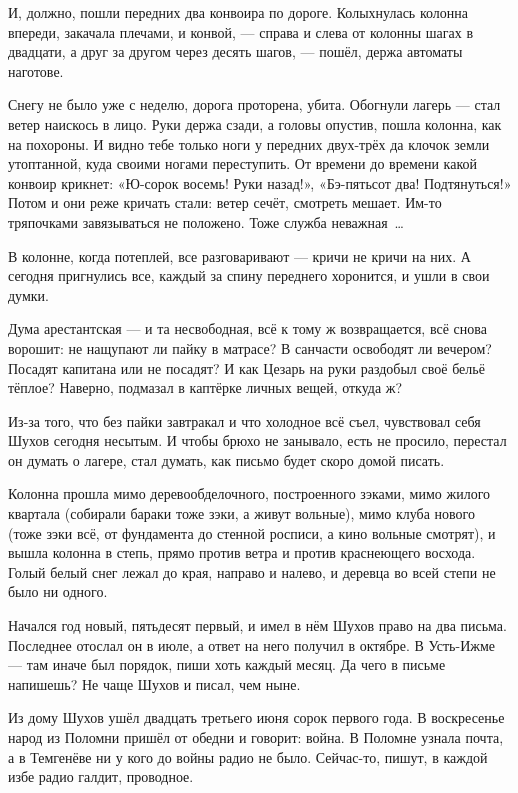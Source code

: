 И, должно, пошли передних два конвоира по дороге. Колыхнулась колонна впереди, закачала плечами, и конвой, --- справа и слева от колонны шагах в двадцати, а друг за другом через десять шагов, --- пошёл, держа автоматы наготове.

Снегу не было уже с неделю, дорога проторена, убита. Обогнули лагерь --- стал ветер наискось в лицо. Руки держа сзади, а головы опустив, пошла колонна, как на похороны. И видно тебе только ноги у передних двух-трёх да клочок земли утоптанной, куда своими ногами переступить. От времени до времени какой конвоир крикнет: «Ю-сорок восемь! Руки назад!», «Бэ-пятьсот два! Подтянуться!» Потом и они реже кричать стали: ветер сечёт, смотреть мешает. Им-то тряпочками завязываться не положено. Тоже служба неважная~\dots{}

В колонне, когда потеплей, все разговаривают --- кричи не кричи на них. А сегодня пригнулись все, каждый за спину переднего хоронится, и ушли в свои думки.

Дума арестантская --- и та несвободная, всё к тому ж возвращается, всё снова ворошит: не нащупают ли пайку в матрасе? В санчасти освободят ли вечером? Посадят капитана или не посадят? И как Цезарь на руки раздобыл своё бельё тёплое? Наверно, подмазал в каптёрке личных вещей, откуда ж?

Из-за того, что без пайки завтракал и что холодное всё съел, чувствовал себя Шухов сегодня несытым. И чтобы брюхо не занывало, есть не просило, перестал он думать о лагере, стал думать, как письмо будет скоро домой писать.

Колонна прошла мимо деревообделочного, построенного зэками, мимо жилого квартала (собирали бараки тоже зэки, а живут вольные), мимо клуба нового (тоже зэки всё, от фундамента до стенной росписи, а кино вольные смотрят), и вышла колонна в степь, прямо против ветра и против краснеющего восхода. Голый белый снег лежал до края, направо и налево, и деревца во всей степи не было ни одного.

Начался год новый, пятьдесят первый, и имел в нём Шухов право на два письма. Последнее отослал он в июле, а ответ на него получил в октябре. В Усть-Ижме --- там иначе был порядок, пиши хоть каждый месяц. Да чего в письме напишешь? Не чаще Шухов и писал, чем ныне.

Из дому Шухов ушёл двадцать третьего июня сорок первого года. В воскресенье народ из Поломни пришёл от обедни и говорит: война. В Поломне узнала почта, а в Темгенёве ни у кого до войны радио не было. Сейчас-то, пишут, в каждой избе радио галдит, проводное.

